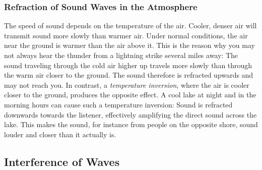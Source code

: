 \documentclass[11pt]{NSF}
\begin{document}
\subsubsection{Refraction of Sound Waves in the Atmosphere}

The speed of sound depends on the temperature of the air. Cooler, denser air
will transmit sound more slowly than warmer air. Under normal conditions, the
air near the ground is warmer than the air above it. This is the reason why you
may not always hear the thunder from a lightning strike several miles away: The
sound traveling through the cold air higher up travels more slowly than through
the warm air closer to the ground. The sound therefore is refracted upwards and
may not reach you. In contrast, a {\em temperature inversion}, where the air is
cooler closer to the ground, produces the opposite effect. A cool lake at night
and in the morning hours can cause such a temperature inversion: Sound is
refracted downwards towards the listener, effectively amplifying the direct
sound across the lake. This makes the sound, for instance from people on the
opposite shore, sound louder and closer than it actually is.

\subsection{Interference of Waves}
\end{document}

